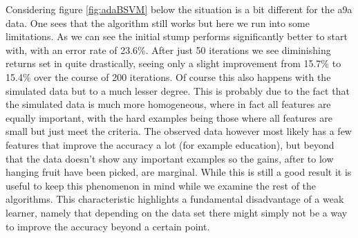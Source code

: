 \par Considering figure \ref{fig:adaBSVM} below the situation is a bit different for the a9a data. One sees that the algorithm still works but here we run into some limitations. As we can see the initial stump performs significantly better to start with, with an error rate of 23.6\%. After just 50 iterations we see diminishing returns set in quite drastically, seeing only a slight improvement from 15.7\% to 15.4\% over the course of 200 iterations. Of course this also happens with the simulated data but to a much lesser degree. This is probably due to the fact that the simulated data is much more homogeneous, where in fact all features are equally important, with the hard examples being those where all features are small but just meet the criteria. The observed data however most likely has a few features that improve the accuracy a lot (for example education), but beyond that the data doesn't show any important examples so the gains, after to low hanging fruit have been picked, are marginal. While this is still a good result it is useful to keep this phenomenon in mind while we examine the rest of the algorithms. This characteristic highlights a fundamental disadvantage of a weak learner, namely that depending on the data set there might simply not be a way to improve the accuracy beyond a certain point. 

